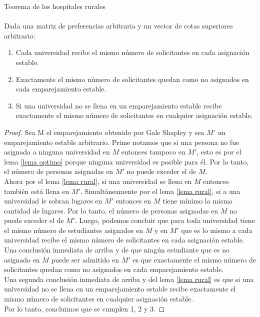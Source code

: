 \begin{teo}{Teorema de los hospitales rurales \\ }
\label{rural}
\cite{GaleSotomayor}\\
Dada una matriz de preferencias arbitraria y un vector de cotas superiores arbitrario:
\begin{enumerate}
\item Cada universidad recibe el mismo número de solicitantes en cada asignación estable.
\item Exactamente el mismo número de solicitantes quedan como no asignados en cada emparejamiento estable. 
\item Si una universidad no se llena en un emparejamiento estable recibe exactamente el mismo número de solicitantes en cualquier asignación estable. 
\end{enumerate}
\end{teo}
\begin{proof}
Sea M el emparejamiento obtenido por Gale Shapley y sea $M'$ un emparejamiento estable arbitrario. Prime notamos que si una persona no fue asignada a ninguna universidad en $M$ entonces tampoco en $M'$, esto es por el lema \ref{lema optimo} porque ninguna universidad es posible para él. Por lo tanto, el número de personas asignadas en $M'$ no puede exceder el de $M$. \\
Ahora por el lema \ref{lema rural}, si una universidad se llena en $M$ entonces también está llena en $M'$. Simultáneamente por el lema \ref{lema rural}, si a una universidad le sobran lugares en $M'$ entonces en $M$ tiene mínimo la misma cantidad de lugares. Por lo tanto, el número de personas asignadas en $M$ no puede exceder el de $M'$. Luego, podemos concluir que para toda universidad tiene el mismo número de estudiantes asignados en $M$ y en $M'$ que es lo mismo a cada universidad recibe el mismo número de solicitantes en cada asignación estable. \\
Una conclusión inmediata de arriba y de que ningún estudiante que es no asignado en $M$ puede ser admitido en $M'$ es que exactamente el mismo número de solicitantes quedan como no asignados en cada emparejamiento estable. \\
Una segunda conclusión inmediata de arriba y del lema \ref{lema rural} es que si una universidad no se llena en un emparejamiento estable recibe exactamente el mismo número de solicitantes en cualquier asignación estable.\\
Por lo tanto, concluimos que se cumplen 1, 2 y 3.
\end{proof}


